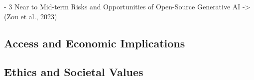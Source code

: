 - 3 Near to Mid-term Risks and Opportunities of Open-Source Generative AI -> (Zou et al., 2023)
\citep{zou_universal_2023}

\subsection{Access and Economic Implications}

\subsection{Ethics and Societal Values}
